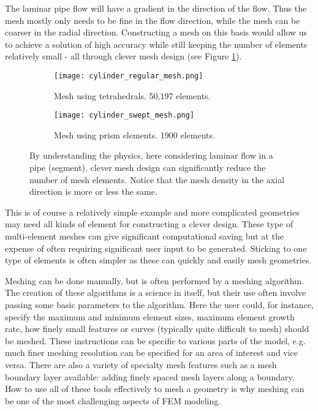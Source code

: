The laminar pipe flow will have a gradient in the direction of the flow.
Thus the mesh mostly only needs to be fine in the flow direction, while the mesh can be coarser in the radial direction.
Constructing a mesh on this basis would allow us to achieve a solution of high accuracy while still keeping the number of elements relatively small - all through clever mesh design (see Figure \ref{fig:cylinder_mesh}).\par

\begin{figure}[htb!]
  \centering
  \begin{subfigure}{0.49\textwidth}
    \texttt{[image: cylinder\_regular\_mesh.png]}
  \caption{Mesh using tetrahedrals. 50,197 elements.}
  \end{subfigure}
  \begin{subfigure}{0.49\textwidth}
    \texttt{[image: cylinder\_swept\_mesh.png]}
  \caption{Mesh using prism elements. 1900 elements.}
  \end{subfigure}
  \caption[Example of how physical mesh design can reduce the number of elements.]{By understanding the physics, here considering laminar flow in a pipe (segment), clever mesh design can significantly reduce the number of mesh elements. Notice that the mesh density in the axial direction is more or less the same.}
  \label{fig:cylinder_mesh}
\end{figure}

This is of course a relatively simple example and more complicated geometries may need all kinds of element for constructing a clever design.
These type of multi-element meshes can give significant computational saving but at the expense of often requiring significant user input to be generated.
Sticking to one type of elements is often simpler as these can quickly and easily mesh geometries.\par

Meshing can be done manually, but is often performed by a meshing algorithm.
The creation of these algorithms is a science in itself, but their use often involve passing some basic parameters to the algorithm.
Here the user could, for instance, specify the maximum and minimum element sizes, maximum element growth rate, how finely small features or curves (typically quite difficult to mesh) should be meshed.
These instructions can be specific to various parts of the model, e.g. much finer meshing resolution can be specified for an area of interest and vice versa.
There are also a variety of specialty mesh features such as a mesh boundary layer available: adding finely spaced mesh layers along a boundary.
How to use all of these tools effectively to mesh a geometry is why meshing can be one of the most challenging aspects of FEM modeling.\par

